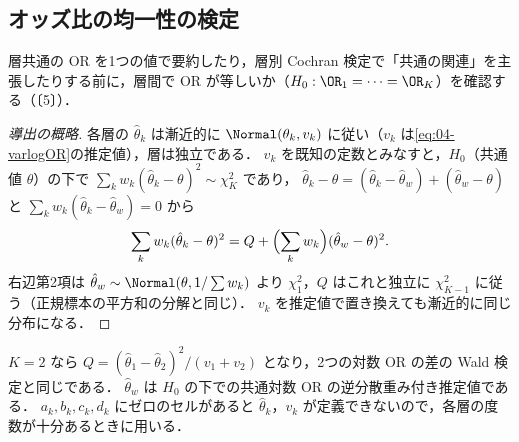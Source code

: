 \subsection{オッズ比の均一性の検定}\label{subsec:07-homog}
\Hinshutsu 層共通の OR を1つの値で要約したり，層別 Cochran 検定で「共通の関連」を主張したりする前に，層間で OR が等しいか（$H_0:\OR_1=\dots=\OR_K$）を確認する（〔5〕）．
\begin{proof}[導出の概略]
各層の $\hat\theta_k$ は漸近的に $\Normal(\theta_k,v_k)$ に従い（$v_k$ は\cref{eq:04-varlogOR}の推定値），層は独立である．
$v_k$ を既知の定数とみなすと，$H_0$（共通値 $\theta$）の下で $\sum_kw_k(\hat\theta_k-\theta)^2\sim\chi^2_K$ であり，
$\hat\theta_k-\theta=(\hat\theta_k-\hat\theta_w)+(\hat\theta_w-\theta)$ と $\sum_kw_k(\hat\theta_k-\hat\theta_w)=0$ から
\[
\sum_kw_k(\hat\theta_k-\theta)^2=Q+\Bigl(\sum_kw_k\Bigr)(\hat\theta_w-\theta)^2 .
\]
右辺第2項は $\hat\theta_w\sim\Normal(\theta,1/\sum w_k)$ より $\chi^2_1$，$Q$ はこれと独立に $\chi^2_{K-1}$ に従う（正規標本の平方和の分解と同じ）．
$v_k$ を推定値で置き換えても漸近的に同じ分布になる．
\end{proof}
$K=2$ なら $Q=(\hat\theta_1-\hat\theta_2)^2/(v_1+v_2)$ となり，2つの対数 OR の差の Wald 検定と同じである．
$\hat\theta_w$ は $H_0$ の下での共通対数 OR の逆分散重み付き推定値である．
$a_k,b_k,c_k,d_k$ にゼロのセルがあると $\hat\theta_k$，$v_k$ が定義できないので，各層の度数が十分あるときに用いる．

